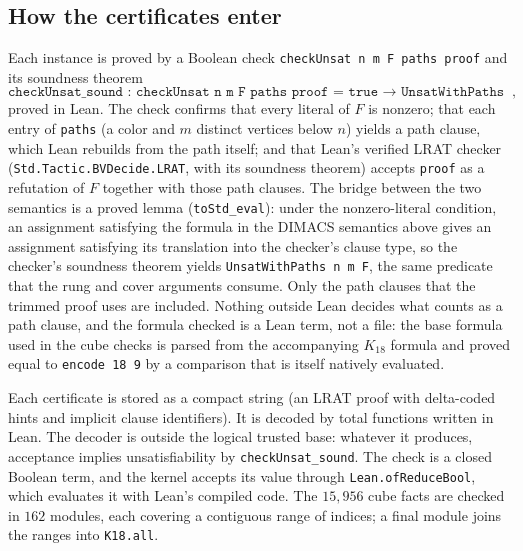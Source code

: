 \subsection{How the certificates enter}\label{sec:certs}
Each instance is proved by a Boolean check
\texttt{checkUnsat n m F paths proof} and its soundness theorem
\[
\texttt{checkUnsat\_sound :\ checkUnsat n m F paths proof = true →
UnsatWithPaths n m F},
\]
proved in Lean. The check confirms that every literal of $F$ is nonzero;
that each entry of \texttt{paths} (a color and $m$ distinct vertices below
$n$) yields a path clause, which Lean rebuilds from the path itself; and
that Lean's verified LRAT checker (\texttt{Std.Tactic.BVDecide.LRAT}, with
its soundness theorem) accepts \texttt{proof} as a refutation of $F$
together with those path clauses. The bridge between the two semantics is
a proved lemma (\texttt{toStd\_eval}): under the nonzero-literal condition,
an assignment satisfying the formula in the DIMACS semantics above gives an
assignment satisfying its translation into the checker's clause type, so
the checker's soundness theorem yields \texttt{UnsatWithPaths n m F}, the
same predicate that the rung and cover arguments consume. Only the path
clauses that the trimmed proof uses are included. Nothing outside Lean decides what counts as a
path clause, and the formula checked is a Lean term, not a file: the base
formula used in the cube checks is parsed from the accompanying $K_{18}$
formula and proved equal to \texttt{encode 18 9} by a comparison that is
itself natively evaluated.

Each certificate is stored as a compact string (an LRAT proof with
delta-coded hints and implicit clause identifiers). It is decoded by total
functions written in Lean. The decoder is outside the logical trusted
base: whatever it produces, acceptance implies unsatisfiability by
\texttt{checkUnsat\_sound}. The check is a closed Boolean term,
and the kernel accepts its value through \texttt{Lean.ofReduceBool}, which
evaluates it with Lean's compiled code. The $15{,}956$ cube facts are
checked in $162$ modules, each covering a contiguous range of indices; a
final module joins the ranges into \texttt{K18.all}.

